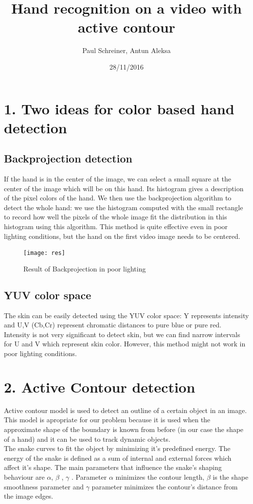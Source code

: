 \documentclass{report}
\title{Hand recognition on a video with active contour}
\author{Paul Schreiner, Antun Aleksa}
\date{28/11/2016}
\begin{document}
\maketitle



\section*{1. Two ideas for color based hand detection}

\subsection*{Backprojection detection}

If the hand is in the center of the image, we can select a small square at the center of the image which will be on this hand. Its histogram gives a description of the pixel colors of the hand. We then use the backprojection algorithm to detect the whole hand: we use the histogram computed with the small rectangle to record how well the pixels of the whole image fit the distribution in this histogram using this algorithm. This method is quite effective even in poor lighting conditions, but the hand on the first video image needs to be centered. 

\begin{figure}[H]
\centering
              \texttt{[image: res]}
              \caption{Result of Backprojection in poor lighting}
          \end{figure}

\subsection*{YUV color space}

The skin can be easily detected using the YUV color space: Y represents intensity and U,V (Cb,Cr) represent chromatic distances to pure blue or pure red. Intensity is not very significant to detect skin, but we can find narrow intervals for U and V which represent skin color. However, this method might not work in poor lighting conditions. 



\section*{2. Active Contour detection}

Active contour model is used to detect an outline of a certain object in an image. This model is apropriate for our problem because it is used when the approximate shape of the boundary is known from before (in our case the shape of a hand) and it can be used to track dynamic objects. \\
The snake curves to fit the object by minimizing it's predefined energy. The energy of the snake is defined as a sum of internal and external forces which affect it's shape. The main parameters that influence the snake's shaping behaviour are $\alpha$, $\beta$ , $\gamma$ . Parameter $\alpha$ minimizes the contour length, $\beta$ is the shape smoothness parameter and $\gamma$ parameter minimizes the contour's distance from the image edges.
\end{document}
